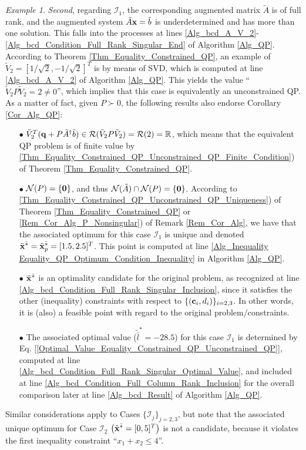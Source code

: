 \documentclass[9pt,twocolumn,twoside,lineno]{pnas-new-1}
\newcommand{\bfc}{{\bf c}}
\newcommand{\bfx}{{\bf x}}
\newcommand{\bfq}{{\bf q}}
\newcommand{\bfzero}{{\bf 0}}
\newcommand{\real}{\mathbb{R}}
\newcommand{\calI}{{\mathcal I}}
\newcommand{\calN}{{\mathcal N}}
\newcommand{\calR}{{\mathcal R}}
\theoremstyle{remark}
\newtheorem{example}{Example}[section]
\begin{document}
\begin{example}
\textit{Second}, regarding $\calI_1$, the corresponding augmented matrix $\tilde A$ is of full rank, and the augmented system $\tilde A\bfx=\tilde b$ is underdetermined and has more than one solution. This falls into the processes at lines \ref{Alg_bcd_A_V_2}-\ref{Alg_bcd_Condition_Full_Rank_Singular_End} of Algorithm \ref{Alg_QP}. According to Theorem \ref{Thm_Equality_Constrained_QP}, an example of $\tilde V_2=[1/\sqrt{2},-1/\sqrt{2}]^T$ is by means of SVD, which is computed at line \ref{Alg_bcd_A_V_2} of Algorithm \ref{Alg_QP}. This yields the value ``$\tilde V_2P\tilde V_2=2\ne 0$'', which implies that this case is equivalently an unconstrained QP. As a matter of fact, given $P\succ 0$, the following results also endorse Corollary \ref{Cor_Alg_QP}:
\begin{enumerate}
\item[$\bullet$] $\tilde V_2^T(\bfq+P\tilde A^\dagger\tilde b)\in\calR(\tilde V_2 P\tilde V_2)=\calR(2)=\real$, which means that the equivalent QP problem is of finite value by \ref{Thm_Equality_Constrained_QP_Unconstrained_QP_Finite_Condition}) of Theorem \ref{Thm_Equality_Constrained_QP}.
\item[$\bullet$] $\calN(P)=\{\bfzero\}$, and thus $\calN(\tilde A)\cap\calN(P)=\{\bfzero\}$. According to \ref{Thm_Equality_Constrained_QP_Unconstrained_QP_Uniqueness}) of Theorem \ref{Thm_Equality_Constrained_QP} or \ref{Rem_Cor_Alg_P_Nonsingular}) of Remark \ref{Rem_Cor_Alg}, we have that the associated optimum for this case $\calI_1$ is unique and denoted $\tilde\bfx^{\bar *}=\tilde\bfx_p^{\bar *}=[1.5,2.5]^T$. This point is computed at line \ref{Alg_Inequality Equality_QP_Optimum_Condition_Inequality} in Algorithm \ref{Alg_QP}.
\item[$\bullet$] $\tilde\bfx^{\bar *}$ is an optimality candidate for the original problem, as recognized at line \ref{Alg_bcd_Condition_Full_Rank_Singular_Inclusion}, since it satisfies the other (inequality) constraints with respect to $\{(\bfc_i,d_i)\}_{i=2,3}$. In other words, it is (also) a feasible point with regard to the original problem/constraints.
\item[$\bullet$] The associated optimal value ($\tilde{\bar l}^*=-28.5$) for this case $\calI_1$ is determined by Eq. [\ref{Optimal_Value_Equality_Constrained_QP_Unconstrained_QP}], computed at line \ref{Alg_bcd_Condition_Full_Rank_Singular_Optimal_Value}, and included at line \ref{Alg_bcd_Condition_Full_Column_Rank_Inclusion} for the overall comparison later at line \ref{Alg_bcd_Result} of Algorithm \ref{Alg_QP}.
\end{enumerate}
Similar considerations apply to Cases $\{\calI_j\}_{j=2,3}$, but note that the associated unique optimum for Case $\calI_2$ $\left(\tilde\bfx^{\bar *}=[0,5]^T\right)$ is not a candidate, because it violates the first inequality constraint ``$x_1+x_2\le 4$''.


\end{example}
\end{document}
